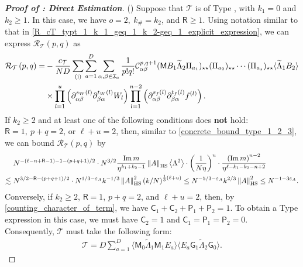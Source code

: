 \documentclass[10pt,reqno]{amsart}
\numberwithin{equation}{section}
\numberwithin{figure}{section}
\newcommand{\rmnum}[1]{\uppercase\expandafter{\romannumeral #1}}
\theoremstyle{plain} %
\theoremstyle{definition} %
\newcommand{\wt}{\widetilde}
\renewcommand{\txt}[1]{\text{\rm{#1}}}
\newcommand{\cT}{\mathcal T}
\newcommand{\cI}{\mathcal{I}}
\newcommand{\cC}{\mathcal{C}}
\newcommand{\cR}{{\mathcal R}}
\newcommand{\sG}{\mathsf G}
\newcommand{\sM}{\mathsf M}
\newcommand{\sR}{\mathsf R}
\newcommand{\sC}{\mathsf C}
\newcommand{\sP}{\mathsf P}
\renewcommand{\leq}{\le}
\renewcommand{\geq}{\ge}
\newcommand{\p}[1]{({#1})}
\newcommand{\pa}[1]{\left({#1}\right)}
\newcommand{\norma}[1]{\left\lVert #1 \right\rVert}
\newcommand{\avg}[1]{\langle #1 \rangle}
\newcommand{\avga}[1]{\left\langle #1 \right\rangle}
\DeclareMathOperator{\im}{\mathrm{Im}}
\newcommand{\tLambda}{{\wt{\Lambda}}}
\newcommand{\HS}{\txt{HS}}
\newcommand{\dsum}[1]{\sum_{#1=1}^D}
\newcommand{\iab}{\alpha\beta}
\newcommand{\iba}{\beta\alpha}
\newcommand{\tl}{\tLambda}
\newcommand{\mm}{\ell}
\numberwithin{equation}{section}
\begin{document}
\begin{proof}[\bf Proof of : Direct Estimation]
\smallskip
         \noindent(\rmnum{4}) 
         Suppose that $\cT$ is of Type \rmnum{2}, with $k_1=0$ and $k_2\geq 1$. In this case, we have $o=2,\ k_{\#}=k_2$, and $\sR\geq 1$. Using notation similar to that in \eqref{R_cT_typt_1_k_1_geq_1_k_2-geq_1_explicit_expression}, we can express $\cR_{\cT}\pa{p,q}$ as 
         \begin{equation}\nonumber
             \begin{aligned}
                 \cR_{\cT}\pa{p,q}=&- \frac{c_{\cT}}{ND}\sum_{\pa{\txt{i}}}\sum_{a=1}^D\sum_{\alpha,\beta\in \cI_a}\frac{1}{p!q!}\cC_{\iab}^{p,q+1}\p{\sM B_1 \tl_2\Pi_{a_1}}_{\star\star}\p{\Pi_{a_2}}_{\star\star}\cdots\p{\Pi_{a_{s}}}_{\star\star}\avg{\tl_1 B_2}\\
                 &\times\prod_{l=1}^{u}\pa{\partial_{\iab}^{s_W\pa{l}}\partial_{\iba}^{t_W\pa{l}}W_l}\prod_{l=1}^{n-2}\pa{\partial_{\iab}^{s_f\pa{l}}\partial_{\iba}^{t_f\pa{l}}f^{\pa{l}}}.
             \end{aligned}
         \end{equation}
          If $k_2\geq 2$ and at least one of the following conditions does {\bf not} hold: $\sR=1,\ p+q=2$, or $ \mm+u=2$, then, similar to \eqref{concrete_bound_type_1_2_3}, we can bound $\cR_{\cT}\pa{p,q}$ by 
         \begin{equation}\label{concrete_bound_type_2_2_1}
             \begin{aligned}
                 &~ N^{-\pa{\mm-n+\sR-1}-1-\pa{p+q+1}/2}\cdot N^{3/2}\frac{\im m}{\eta^{k_1+k_2-1}}\norma{A}_{\HS}\avga{\Lambda^2}\cdot \pa{\frac{1}{N\eta}}^{u}\cdot \frac{\pa{\im m}^{n-2}}{\eta^{\mm-k_1-k_2-n+2}}\\
                 \lesssim &~ N^{3/2-\sR-\pa{p+q+1}/2}\cdot{N^{1/3-\varepsilon_A}k^{-1/3}}\norma{A}_{\HS}^2\pa{k/N}^{\frac 13 (\mm+u)}\leq N^{-5/3-\varepsilon_A}k^{2/3}\norma{A}_{\HS}^2\leq N^{-1-3\varepsilon_A}.
             \end{aligned}
         \end{equation}
         Conversely, if $k_2\ge 2$, $\sR=1$, $p+q=2$, and $\mm+u=2$, then, by \eqref{counting_character_of_term}, we have $\sC_1+\sC_2+\sP_1+\sP_2=1$. To obtain a Type \rmnum{2} expression in this case, we must have  $\sC_2=1$ and $\sC_1=\sP_1=\sP_2=0$. Consequently,  $\cT$ must take the following form:
         \begin{equation}\nonumber
             \begin{aligned}
                 \cT=D\dsum{a}\avg{\sM_0\tl_1\sM_1E_a}\avg{E_a\sG_1\tl_2\sG_0}.
             \end{aligned}

\end{equation}
\end{proof}
\end{document}
